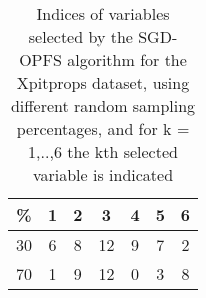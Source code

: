 \begin{table}
	\begin{center}
		\begin{tabular}{c c c c c c c}
			\% & 1 & 2 & 3 & 4 & 5 & 6 \\
			\hline
			30 & 6 & 8 & 12 & 9 & 7 & 2 \\
			70 & 1 & 9 & 12 & 0 & 3 & 8 \\
		\end{tabular}
	\end{center}
	\caption{Indices of variables selected by the SGD-OPFS algorithm for the Xpitprops dataset, using different random sampling percentages, and for k = 1,..,6 the kth selected variable is indicated}
\end{table}